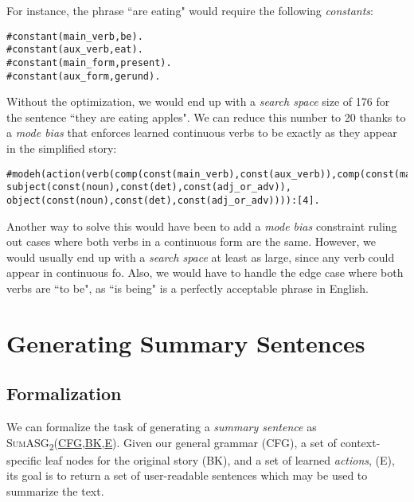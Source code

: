 For instance, the phrase ``are eating" would require the following \textit{constants}:

\begin{displayquote}
\begin{lstlisting}
#constant(main_verb,be).
#constant(aux_verb,eat).
#constant(main_form,present).
#constant(aux_form,gerund).
\end{lstlisting}
\end{displayquote}

Without the optimization, we would end up with a \textit{search space} size of 176 for the sentence ``they are eating apples". We can reduce this number to 20 thanks to a \textit{mode bias} that enforces learned continuous verbs to be exactly as they appear in the simplified story:

\begin{displayquote}
\begin{lstlisting}[numbers=none]
#modeh(action(verb(comp(const(main_verb),const(aux_verb)),comp(const(main_form),const(aux_form))), subject(const(noun),const(det),const(adj_or_adv)), object(const(noun),const(det),const(adj_or_adv)))):[4].
\end{lstlisting}
\end{displayquote} 

Another way to solve this would have been to add a \textit{mode bias} constraint ruling out cases where both verbs in a continuous form are the same. However, we would usually end up with a \textit{search space} at least as large, since any verb could appear in continuous fo. Also, we would have to handle the edge case where both verbs are ``to be", as ``is being" is a perfectly acceptable phrase in English.

\section{Generating Summary Sentences}

\subsection{Formalization}

We can formalize the task of generating a \textit{summary sentence} as \textsc{SumASG\textsubscript{2}(\underline{CFG},\underline{BK},\underline{E})}. Given our general grammar (\textsc{CFG}), a set of context-specific leaf nodes for the original story (\textsc{BK}), and a set of learned \textit{actions}, (\textsc{E}), its goal is to return a set of user-readable sentences which may be used to summarize the text.

